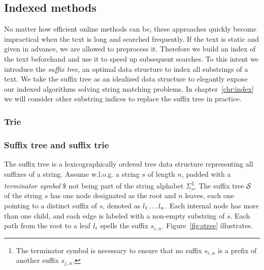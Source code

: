 
\subsection{Indexed methods}
\label{sub:introindex}

No matter how efficient online methods can be, these approaches quickly become impractical when the text is long and searched frequently.
If the text is static and given in advance, we are allowed to preprocess it.
Therefore we build an index of the text beforehand and use it to speed up subsequent searches.
To this intent we introduce the \emph{suffix tree}, an optimal data structure to index all substrings of a text.
We take the suffix tree as an idealized data structure to elegantly expose our indexed algorithms solving string matching problems.
In chapter~\ref{chr:index} we will consider other substring indices to replace the suffix tree in practice.

\subsubsection{Trie}

\subsubsection{Suffix tree and suffix trie}

The suffix tree \citep{Morrison1968} is a lexicographically ordered tree data structure representing all suffixes of a string.
Assume w.l.o.g. a string $s$ of length $n$, padded with a \emph{terminator symbol} $\$$ not being part of the string alphabet $\Sigma$\footnote{The terminator symbol is necessary to ensure that no suffix $s_{i..n}$ is a prefix of another suffix $s_{j..n}$.}.
The suffix tree $\mathcal {S}$ of the string $s$ has one node designated as the root and $n$ leaves, each one pointing to a distinct suffix of $s$, denoted as $l_1 \dots l_n$.
Each internal node has more than one child, and each edge is labeled with a non-empty substring of $s$.
Each path from the root to a leaf $l_i$ spells the suffix $s_{i..n}$.
Figure~\ref{fig:stree} illustrates.



